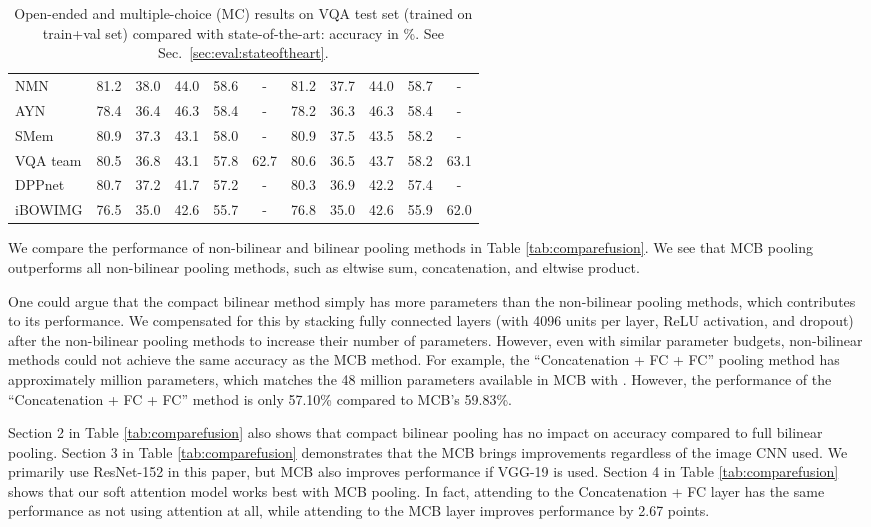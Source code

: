 \documentclass[11pt,letterpaper]{article}
\DeclareRobustCommand{\Secref}[1]{Sec.~\ref{#1}}
\begin{document}
\begin{table*}[t]
\begin{tabular}{lcccccccccc}
NMN \cite{andreas16cvpr} & 81.2 & 38.0 & 44.0 & 58.6 & - & 81.2 & 37.7 & 44.0 & 58.7 & -  \\
AYN \cite{malinowski2016ask} & 78.4 & 36.4 &46.3 &58.4  & -& 78.2&36.3&46.3&58.4 & -\\
    SMem \cite{xu2015ask} & 80.9 & 37.3 & 43.1 & 58.0 & -& 80.9 & 37.5 & 43.5 & 58.2 & - \\
  VQA team \cite{antol2015vqa} & 80.5 & 36.8 & 43.1 & 57.8 & 62.7 & 80.6 & 36.5 & 43.7 & 58.2 & 63.1 \\
  DPPnet \cite{noh2015images} & 80.7 & 37.2 & 41.7 & 57.2 & -& 80.3 & 36.9 & 42.2 & 57.4 & -\\
  iBOWIMG \cite{zhou2015simple}  & 76.5 & 35.0 & 42.6 & 55.7 & -& 76.8 & 35.0 & 42.6 & 55.9 & 62.0 \\
\bottomrule
\end{tabular}
\caption{Open-ended and multiple-choice (MC) results on VQA test set (trained on train+val set) compared with state-of-the-art: accuracy in \%. See \Secref{sec:eval:stateoftheart}.}
\label{tab:vqa_state_of_art}
\vspace{-0.6cm}
\end{table*} 
We compare the performance of non-bilinear and bilinear pooling methods in Table \ref{tab:comparefusion}. We see that MCB pooling outperforms all non-bilinear pooling methods, such as eltwise sum, concatenation, and eltwise product. 

One could argue that the compact bilinear method simply has more parameters than the non-bilinear pooling methods, which contributes to its performance. We compensated for this by stacking fully connected layers (with 4096 units per layer, ReLU activation, and dropout) after the non-bilinear pooling methods to increase their number of parameters. However, even with similar parameter budgets, non-bilinear methods could not achieve the same accuracy as the MCB method. For example, the ``Concatenation + FC + FC'' pooling method has approximately  million parameters, which matches the 48 million parameters available in MCB with . However, the performance of the ``Concatenation + FC + FC'' method is only 57.10\% compared to MCB's 59.83\%.

Section 2 in Table \ref{tab:comparefusion} also shows that compact bilinear pooling has no impact on accuracy compared to full bilinear pooling. Section 3 in Table \ref{tab:comparefusion} demonstrates that the MCB brings improvements regardless of the image CNN used. We primarily use ResNet-152 in this paper, but MCB also improves performance if VGG-19 is used. Section 4 in Table \ref{tab:comparefusion} shows that our soft attention model works best with MCB pooling. In fact, attending to the Concatenation + FC layer has the same performance as not using attention at all, while attending to the MCB layer improves performance by 2.67 points.
\end{document}
